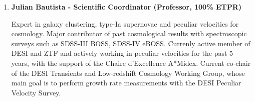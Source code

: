      \begin{enumerate}
     \item \textbf{Julian Bautista - Scientific Coordinator (Professor, 100\% ETPR)} 
     
     Expert in galaxy clustering, 
    type-Ia supernovae and peculiar velocities for cosmology. 
    Major contributor of past cosmological results with spectroscopic surveys 
    such as SDSS-III BOSS, SDSS-IV eBOSS.
    Currenly active member of DESI and ZTF and actively working 
    in peculiar velocities for the past 5 years, with the support of the 
    Chaire d'Excellence A*Midex.
    Current co-chair of the DESI Transients and Low-redshift Cosmology Working Group, 
    whose main goal is to perform growth rate measurements with the DESI Peculiar Velocity Survey. 
    
        



\end{enumerate}
